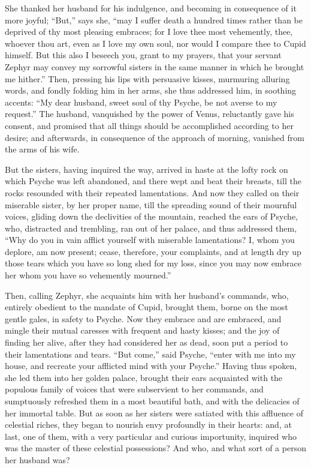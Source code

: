\documentclass{article}
\begin{document}
She thanked her husband for his indulgence, and becoming in consequence of it
more joyful; ``But,'' says she, ``may I suffer death a hundred times rather
than be deprived of thy most pleasing embraces; for I love thee most
vehemently, thee, whoever thou art, even as I love my own soul, nor would I
compare thee to Cupid himself. But this also I beseech you, grant to my
prayers, that your servant Zephyr may convey my sorrowful sisters in the same
manner in which he brought me hither.'' Then, pressing his lips with persuasive
kisses, murmuring alluring words, and fondly folding him in her arms, she thus
addressed him, in soothing accents: ``My dear husband, sweet soul of thy
Psyche, be not averse to my request.'' The husband, vanquished by the power of
Venus, reluctantly gave his consent, and promised that all things should be
accomplished according to her desire; and afterwards, in consequence of the
approach of morning, vanished from the arms of his wife.

But the sisters, having inquired the way, arrived in haste at the lofty rock on
which Psyche was left abandoned, and there wept and beat their breasts, till
the rocks resounded with their repeated lamentations. And now they called on
their miserable sister, by her proper name, till the spreading sound of their
mournful voices, gliding down the declivities of the mountain, reached the ears
of Psyche, who, distracted and trembling, ran out of her palace, and thus
addressed them, ``Why do you in vain afflict yourself with miserable
lamentations? I, whom you deplore, am now present; cease, therefore, your
complaints, and at length dry up those tears which you have so long shed for my
loss, since you may now embrace her whom you have so vehemently mourned.''

Then, calling Zephyr, she acquaints him with her husband's commands, who,
entirely obedient to the mandate of Cupid, brought them, borne on the most
gentle gales, in safety to Psyche. Now they embrace and are embraced, and
mingle their mutual caresses with frequent and hasty kisses; and the joy of
finding her alive, after they had considered her as dead, soon put a period to
their lamentations and tears. ``But come,'' said Psyche, ``enter with me into
my house, and recreate your afflicted mind with your Psyche.'' Having thus
spoken, she led them into her golden palace, brought their ears acquainted with
the populous family of voices that were subservient to her commands, and
sumptuously refreshed them in a most beautiful bath, and with the delicacies of
her immortal table. But as soon as her sisters were satiated with this
affluence of celestial riches, they began to nourish envy profoundly in their
hearts: and, at last, one of them, with a very particular and curious
importunity, inquired who was the master of these celestial possessions? And
who, and what sort of a person her husband was?
\end{document}
